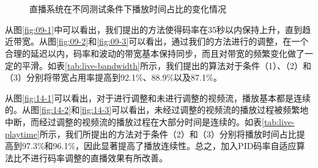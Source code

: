 \begin{figure}[!t]
	\centering
	 \\
	 \\
	\caption{直播系统在不同测试条件下播放时间占比的变化情况}
	\label{fig:14}
\end{figure}

从图\ref{fig:09-1}中可以看出，我们提出的方法使得码率在35秒以内保持上升，直到趋近带宽。从图\ref{fig:09-2}和\ref{fig:09-3}可以看出，通过我们的方法进行的调整，在一个合理的延迟以内，码率和波动的带宽基本保持同步，而且对带宽的频繁变化做了一定的平滑。如表\ref{tab:live-bandwidth}所示，我们提出的算法对于条件（1）、（2）和（3）分别将带宽占用率提高到92.1\%、88.9\%以及87.1\%。

从图\ref{fig:14-1}可以看出，对于进行调整和未进行调整的视频流，播放基本都是连续的。从图\ref{fig:14-2}和\ref{fig:14-3}可以看出，未经过调整的视频流的播放过程被频繁地中断，而经过调整的视频流的播放过程在大部分时间是连续的。如表\ref{tab:live-playtime}所示，我们所提出的方法对于条件（2）和（3）分别将播放时间占比提高到97.3\%和96.1\%，因此显著提高了播放连续性。总之，加入PID码率自适应算法比不进行码率调整的直播效果有所改善。

